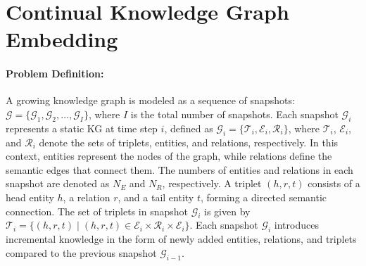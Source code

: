 \documentclass[runningheads]{llncs}
\begin{document}




\section{Continual Knowledge Graph Embedding}

\paragraph{\textbf{Problem Definition}:} A growing knowledge graph is modeled as a sequence of snapshots: $\mathcal{G} = \{\mathcal{G}_1, \mathcal{G}_2, \dots, \mathcal{G}_I\}$, where $I$ is the total number of snapshots. Each snapshot $\mathcal{G}_i$ represents a static KG at time step $i$, defined as $\mathcal{G}_i = \{\mathcal{T}_i, \mathcal{E}_i, \mathcal{R}_i\}$, where $\mathcal{T}_i$, $\mathcal{E}_i$, and $\mathcal{R}_i$ denote the sets of triplets, entities, and relations, respectively. In this context, entities represent the nodes of the graph, while relations define the semantic edges that connect them. The numbers of entities and relations in each snapshot are denoted as $N_E$ and $N_R$, respectively. A triplet $(h, r, t)$ consists of a head entity $h$, a relation $r$, and a tail entity $t$, forming a directed semantic connection. The set of triplets in snapshot $\mathcal{G}_i$ is given by $\mathcal{T}_i = \{(h, r, t) \mid (h, r, t) \in \mathcal{E}_i \times \mathcal{R}_i \times \mathcal{E}_i\}$. Each snapshot $\mathcal{G}_i$ introduces incremental knowledge in the form of newly added entities, relations, and triplets compared to the previous snapshot $\mathcal{G}_{i-1}$.

\end{document}

